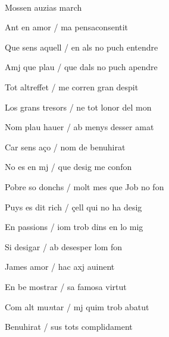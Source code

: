 \documentclass[12pt]{article}
\renewcommand{\espaiAbansEtiquetaPoema}{\vspace{0ex}}
\begin{document}
\begin{estrofa}

\espaiAbansEtiquetaPoema

\\

\begin{rubrica}

Mossen auzias march \clauTancada

\end{rubrica}

\end{estrofa}


\begin{estrofa}

 Ant en amor / ma pensaconsentit

 Que sens aquell / en als no puch entendre

 Amj que plau / que dals no puch apendre

 Tot altreffet / me corren gran despit

 Los grans tresors / ne tot lonor del mon

 Nom plau hauer / ab menys desser amat

 Car sens a\c{c}o / nom de benuhirat

 No es en mj / que desig me confon

\end{estrofa}



\begin{estrofa}

 Pobre so donchs / molt mes que Job no fon

 Puys es dit rich / \c{c}ell qui no ha desig

 En passions / iom trob dins en lo mig

 Si desigar / ab desesper lom fon

 James amor / hac axj auinent

 En be mostrar / sa famosa virtut

 Com alt mu\textit{n}tar / mj quim trob abatut

 Benuhirat / sus tots complidament

\end{estrofa}
\end{document}
